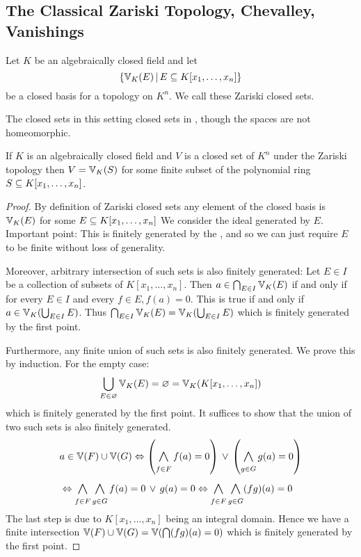 \subsection{The Classical Zariski Topology, Chevalley, Vanishings}%

\begin{dfn}
    Let $K$ be an algebraically closed field and let 
    \[\left\{\mathbb{V}_K(E) \,|\, E \subseteq K[x_1, \dots, x_n]\right\}\]
    be a closed basis for a topology on $K^n$.
    We call these Zariski closed sets.
\end{dfn}
The closed sets in this setting 
closed sets in ,
though the spaces are not homeomorphic.

\begin{prop}
    If $K$ is an algebraically closed field and 
    $V$ is a closed set of $K^n$ under the
    Zariski topology then $V = \mathbb{V}_K(S)$ for some finite subset 
    of the polynomial ring $S \subseteq K[x_1,\dots,x_n]$.
\end{prop}
\begin{proof}
    By definition of Zariski closed sets any element of the closed 
    basis is $\mathbb{V}_K(E)$ for some 
    $E \subseteq K[x_1,\dots,x_n]$
    We consider the ideal generated by $E$.
    Important point: This is finitely generated by the 
    , 
    and so we can just require $E$ 
    to be finite without loss of generality.

    Moreover, 
    arbitrary intersection of such sets is also finitely generated:
    Let $E \in I$ be a collection of subsets of $K[x_1, \dots, x_n]$.
    Then $a \in \bigcap_{E \in I} \mathbb{V}_K(E)$ if and only if 
    for every $E \in I$ and every $f \in E, f(a) = 0$.
    This is true if and only if $a \in \mathbb{V}_K(\bigcup_{E \in I} E)$.
    Thus $\bigcap_{E \in I} \mathbb{V}_K(E) = \mathbb{V}_K(\bigcup_{E \in I} E)$
    which is finitely generated by the first point.

    Furthermore, any finite union of such sets is also finitely generated.
    We prove this by induction.
    For the empty case:
    \[\bigcup_{E \in \varnothing} \mathbb{V}_K(E) = \varnothing = 
    \mathbb{V}_K (K[x_1,\dots,x_n])\]
    which is finitely generated by the first point.
    It suffices to show that the union of two such sets is also finitely
    generated.
    \begin{align*}
        &a \in \V(F) \cup \V(G) 
        \iff \brkt{\bigand{f \in F}{} f(a) = 0} \OR 
        \brkt{\bigand{g \in G}{} g(a) = 0} \\
        & \iff \bigand{f \in F}{} \bigand{g \in G}{} 
        f(a) = 0 \OR g(a) = 0
        \iff \bigand{f \in F}{} \bigand{g \in G}{} 
        (fg)(a) = 0
    \end{align*}
    The last step is due to $K[x_1,\dots,x_n]$ being an integral domain.
    Hence we have a finite intersection
    $\mathbb{V}(F) \cup \mathbb{V}(G) = \mathbb{V}(\bigcap (fg)(a) = 0)$
    which is finitely generated by the first point.
\end{proof}

